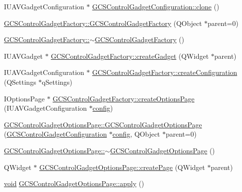 \begin{DoxyCompactItemize}
\item 
I\-U\-A\-V\-Gadget\-Configuration $\ast$ \hyperlink{group___g_c_s_control_gadget_plugin_ga2fcb5b20028b10d2b13fcebe34b82f0f}{G\-C\-S\-Control\-Gadget\-Configuration\-::clone} ()
\item 
\hyperlink{group___g_c_s_control_gadget_plugin_ga4c54b8d610c379bf28bff1793365f00a}{G\-C\-S\-Control\-Gadget\-Factory\-::\-G\-C\-S\-Control\-Gadget\-Factory} (Q\-Object $\ast$parent=0)
\item 
\hyperlink{group___g_c_s_control_gadget_plugin_ga1e3479dbedd932e780c0413327a44453}{G\-C\-S\-Control\-Gadget\-Factory\-::$\sim$\-G\-C\-S\-Control\-Gadget\-Factory} ()
\item 
I\-U\-A\-V\-Gadget $\ast$ \hyperlink{group___g_c_s_control_gadget_plugin_ga36b826b28ef2eea9aef96c03fe2afcb5}{G\-C\-S\-Control\-Gadget\-Factory\-::create\-Gadget} (Q\-Widget $\ast$parent)
\item 
I\-U\-A\-V\-Gadget\-Configuration $\ast$ \hyperlink{group___g_c_s_control_gadget_plugin_ga707c9075a9e10d166b1769820e643095}{G\-C\-S\-Control\-Gadget\-Factory\-::create\-Configuration} (Q\-Settings $\ast$q\-Settings)
\item 
I\-Options\-Page $\ast$ \hyperlink{group___g_c_s_control_gadget_plugin_gaee4fe12f6708684eb50d0bd348633e8a}{G\-C\-S\-Control\-Gadget\-Factory\-::create\-Options\-Page} (I\-U\-A\-V\-Gadget\-Configuration $\ast$\hyperlink{deflate_8c_a4473b5227787415097004fd39f55185e}{config})
\item 
\hyperlink{group___g_c_s_control_gadget_plugin_ga133610c0fce1048e9c145e0e6f4ff7b8}{G\-C\-S\-Control\-Gadget\-Options\-Page\-::\-G\-C\-S\-Control\-Gadget\-Options\-Page} (\hyperlink{class_g_c_s_control_gadget_configuration}{G\-C\-S\-Control\-Gadget\-Configuration} $\ast$\hyperlink{deflate_8c_a4473b5227787415097004fd39f55185e}{config}, Q\-Object $\ast$parent=0)
\item 
\hyperlink{group___g_c_s_control_gadget_plugin_ga1dbf3c631b0254ac184bfa202ea00b17}{G\-C\-S\-Control\-Gadget\-Options\-Page\-::$\sim$\-G\-C\-S\-Control\-Gadget\-Options\-Page} ()
\item 
Q\-Widget $\ast$ \hyperlink{group___g_c_s_control_gadget_plugin_ga581ba836a94117d6d887ee555a4917c6}{G\-C\-S\-Control\-Gadget\-Options\-Page\-::create\-Page} (Q\-Widget $\ast$parent)
\item 
\hyperlink{group___u_a_v_objects_plugin_ga444cf2ff3f0ecbe028adce838d373f5c}{void} \hyperlink{group___g_c_s_control_gadget_plugin_gad8fa5da9631986d02639e5b520028c91}{G\-C\-S\-Control\-Gadget\-Options\-Page\-::apply} ()

\end{DoxyCompactItemize}
